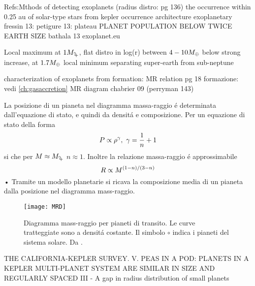 \begin{workout}
Refs:Mthods of detecting exoplanets (radius distro: pg 136)
the occurrence within 0.25 au of solar-type stars from kepler
occurrence architecture exoplanetary
fressin 13: 
petigure 13: plateau PLANET POPULATION BELOW TWICE EARTH SIZE
bathala 13
exoplanet.eu
\end{workout}

\begin{workout}
Local maximum at $1\mjupiter{}$, flat distro in log(r) between $4-10M_{\oplus}{}$ below strong increase, at $1.7M_{\oplus}{}$ local minimum separating super-earth from sub-neptune
\end{workout}

\begin{workout}
characterization of exoplanets from formation: MR relation pg 18
formazione: vedi \ref{ch:gasaccretion}
MR diagram chabrier 09 (perryman 143)

\end{workout}

La posizione di un pianeta nel diagramma massa-raggio \'e determinata dall'equazione di stato, e quindi da densit\'a e composizione. Per un equazione di stato della forma
\begin{equation}
P\propto\rho\expy{\gamma},\ \gamma=\frac{1}{n}+1
\end{equation}
si che per $M\approx\mjupiter$ $n\approx1$.
Inoltre la relazione massa-raggio  \'e approssimabile
\begin{equation}
R\propto M^{(1-n)/(3-n)}
\end{equation}•
Tramite un modello planetarie si ricava la composizione media di un pianeta dalla posizione nel diagramma mass-raggio.

\begin{figure}[!ht] \centering\texttt{[image: MRD]}\label{fig:MRD}\caption{Diagramma mass-raggio per pianeti di transito. Le curve tratteggiate sono a densit\'a costante. Il simbolo $\circ$ indica i pianeti del sistema solare. Da \cite{perryman2011exoplanet}.}
 \end{figure} 

\begin{workout}
THE CALIFORNIA-KEPLER SURVEY. V. PEAS IN A POD: PLANETS IN A KEPLER MULTI-PLANET SYSTEM ARE SIMILAR IN SIZE AND REGULARLY SPACED
						 III - A gap in radius distribution of small planets
\end{workout}

